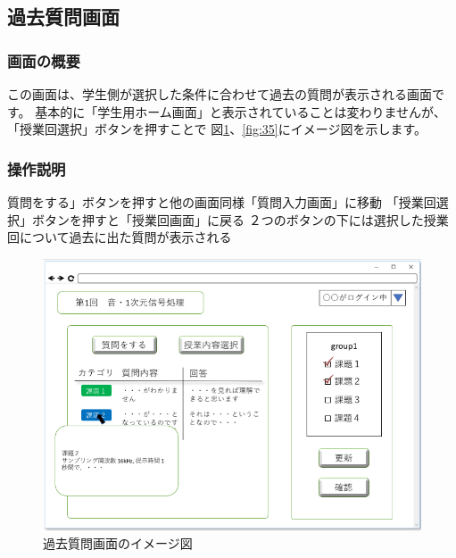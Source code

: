 \subsection{過去質問画面}
\subsubsection{画面の概要}
この画面は、学生側が選択した条件に合わせて過去の質問が表示される画面です。
基本的に「学生用ホーム画面」と表示されていることは変わりませんが、「授業回選択」ボタンを押すことで
図\ref{fig:34}、\ref{fig:35}にイメージ図を示します。

\subsubsection{操作説明}
質問をする」ボタンを押すと他の画面同様「質問入力画面」に移動
「授業回選択」ボタンを押すと「授業回画面」に戻る
２つのボタンの下には選択した授業回について過去に出た質問が表示される

\begin{figure}[phtbp]
  \begin{center}
    \includegraphics[width=1\linewidth,clip]{./img/34.png}
    \caption{過去質問画面のイメージ図}\label{fig:34}
  \end{center}
\end{figure}

